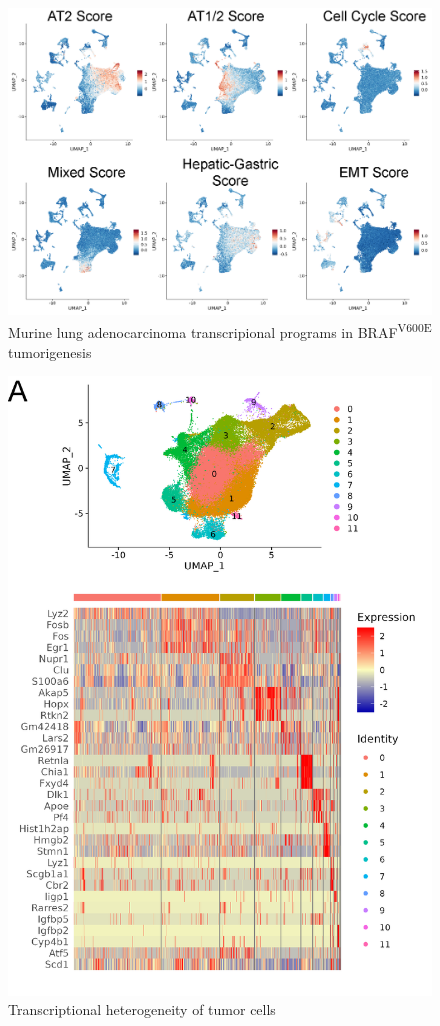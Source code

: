 \begin{figure}
\hypertarget{fig:04}{%
\centering
\includegraphics[width=1\textwidth,height=\textheight]{images/scrna_3.png}
\caption{Murine lung adenocarcinoma transcripional programs in BRAF\textsuperscript{V600E} tumorigenesis}\label{fig:04}
}
\end{figure}

\begin{figure}
\hypertarget{fig:04}{%
\centering
\includegraphics[width=1\textwidth,height=\textheight]{images/scrna_4.png}
\caption{Transcriptional heterogeneity of tumor cells}\label{fig:04}
}
\end{figure}

